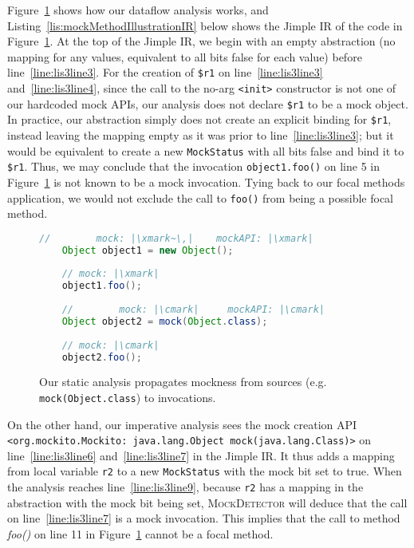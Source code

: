 Figure~\ref{fig:mockMethodIllustration} shows how our dataflow analysis works, and Listing~\ref{lis:mockMethodIllustrationIR} below shows the Jimple IR of the code in Figure~\ref{fig:mockMethodIllustration}. At the top of the Jimple IR, we begin with an empty abstraction (no mapping for any values, equivalent to all bits false for each value) before line~\ref{line:lis3line3}. For the creation of \texttt{\$r1} on line~\ref{line:lis3line3} and~\ref{line:lis3line4}, since the call to the no-arg \texttt{<init>} constructor is not one of our hardcoded mock APIs, our analysis does not declare \texttt{\$r1} to be a mock object. In practice, our abstraction simply does not create an explicit binding for \texttt{\$r1}, instead leaving the mapping empty as it was prior to line~\ref{line:lis3line3}; but it would be equivalent to create a new \texttt{MockStatus} with all bits false and bind it to \texttt{\$r1}. Thus, we may conclude that the invocation \texttt{object1.foo()} on line 5 in Figure~\ref{fig:mockMethodIllustration} is not known to be a mock invocation. Tying back to our focal methods application, we would not exclude the call to \texttt{foo()} from being a possible focal method.

\begin{figure}
	\begin{lstlisting}[basicstyle=\ttfamily,
	basicstyle=\ttfamily,language = Java, framesep=4.5mm, framexleftmargin=1.0mm, captionpos=b, escapechar=|, morekeywords={@Test}]
	//        mock: |\xmark~\,|    mockAPI: |\xmark|
	Object object1 = new Object();
	
	// mock: |\xmark|
	object1.foo();
	
	//        mock: |\cmark|     mockAPI: |\cmark|
	Object object2 = mock(Object.class);
	
	// mock: |\cmark|
	object2.foo();
	\end{lstlisting}
	
	\caption{Our static analysis propagates mockness from sources (e.g. \texttt{mock(Object.class}) to invocations.}
	\label{fig:mockMethodIllustration}
	
\end{figure}

On the other hand, our imperative analysis sees the mock creation API \\ \texttt{<org.mockito.Mockito: java.lang.Object mock(java.lang.Class)>} on line~\ref{line:lis3line6} and~\ref{line:lis3line7} in the Jimple IR. It thus adds a mapping from local variable \texttt{r2} to a new \texttt{MockStatus} with the mock bit set to true. When the analysis reaches line~\ref{line:lis3line9}, because \texttt{r2} has a mapping in the abstraction with the mock bit being set, \textsc{MockDetector} will deduce that the call on line~\ref{line:lis3line7} is a mock invocation. This implies that the call to method \textit{foo()} on line 11 in Figure~\ref{fig:mockMethodIllustration} cannot be a focal method.


